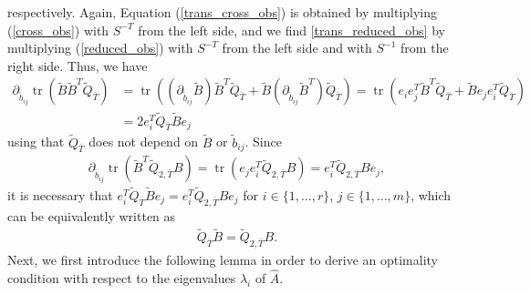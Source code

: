 \documentclass[a4paper,11pt, twoside]{article}
\newcommand{\trace}{\operatorname{tr}}
\begin{document}
respectively. Again, Equation (\ref{trans_cross_obs}) is obtained by multiplying (\ref{cross_obs}) with $S^{-T}$ from the left side, and we find 
\eqref{trans_reduced_obs} by multiplying (\ref{reduced_obs}) with $S^{-T}$ from the left side and with $S^{-1}$ from the right side. Thus, we have 
\begin{align*}
  \partial_{\tilde b_{ij}}  \trace(\tilde B\tilde B^T \tilde Q_{\bar T})&= \trace((\partial_{\tilde b_{ij}} \tilde B)\tilde B^T \tilde Q_{\bar 
T}+ \tilde B(\partial_{\tilde b_{ij}}\tilde B^T) \tilde Q_{\bar T})= \trace(e_i e_j^T\tilde B^T \tilde Q_{\bar 
T}+ \tilde B e_j e_i^T \tilde Q_{\bar T})\\&= 2 e_i^T \tilde Q_{\bar T}\tilde B e_j 
    \end{align*}
    using that $\tilde Q_{\bar T}$ does not depend on $\tilde B$ or $\tilde b_{ij}$. Since \begin{align*}
\partial_{\tilde b_{ij}} \trace(\tilde B^T \tilde Q_{2, \bar T} B)= \trace(e_j e_i^T \tilde Q_{2, \bar T} B)= e_i^T \tilde Q_{2, \bar T} B e_j,
\end{align*}
it is necessary that $e_i^T \tilde Q_{\bar T}\tilde B e_j = e_i^T \tilde Q_{2, \bar T} B e_j$ for $i \in \{1,\ldots,r\}$, $j \in \{1,\ldots,m\}$, 
which can be equivalently written as
\begin{align}\label{opt2}
 \tilde Q_{\bar T}\tilde B  =  \tilde Q_{2, \bar T} B.
\end{align}
Next, we first introduce the following lemma in order to derive an optimality condition with respect to the eigenvalues $\lambda_i$ of $\hat A$.
\end{document}
